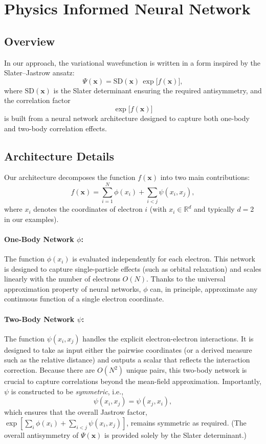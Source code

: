 \section{Physics Informed Neural Network}

\subsection{Overview}

In our approach, the variational wavefunction is written in a form inspired by the Slater–Jastrow ansatz:
\begin{equation}
  \Psi(\mathbf{x}) = \mathrm{SD}(\mathbf{x}) \, \exp\Big[ f(\mathbf{x}) \Big],
\end{equation}
where \(\mathrm{SD}(\mathbf{x})\) is the Slater determinant ensuring the required antisymmetry, and the correlation factor
\[
  \exp\Big[ f(\mathbf{x}) \Big]
\]
is built from a neural network architecture designed to capture both one-body and two-body correlation effects.

\subsection{Architecture Details}

Our architecture decomposes the function \(f(\mathbf{x})\) into two main contributions:
\begin{equation}
  f(\mathbf{x}) = \sum_{i=1}^{N} \phi(x_i) + \sum_{i<j} \psi(x_i, x_j),
\end{equation}
where \(x_i\) denotes the coordinates of electron \(i\) (with \(x_i \in \mathbb{R}^d\) and typically \(d=2\) in our examples).

\paragraph{One-Body Network \(\phi\):}  
The function \(\phi(x_i)\) is evaluated independently for each electron. This network is designed to capture single-particle effects (such as orbital relaxation) and scales linearly with the number of electrons \(O(N)\). Thanks to the universal approximation property of neural networks, \(\phi\) can, in principle, approximate any continuous function of a single electron coordinate.

\paragraph{Two-Body Network \(\psi\):}  
The function \(\psi(x_i, x_j)\) handles the explicit electron-electron interactions. It is designed to take as input either the pairwise coordinates (or a derived measure such as the relative distance) and outputs a scalar that reflects the interaction correction. Because there are \(O(N^2)\) unique pairs, this two-body network is crucial to capture correlations beyond the mean-field approximation. Importantly, \(\psi\) is constructed to be \emph{symmetric}, i.e., 
\[
\psi(x_i, x_j) = \psi(x_j, x_i),
\]
which ensures that the overall Jastrow factor, \(\exp\left[\sum_{i} \phi(x_i) + \sum_{i<j} \psi(x_i,x_j)\right]\), remains symmetric as required. (The overall antisymmetry of \(\Psi(\mathbf{x})\) is provided solely by the Slater determinant.)

